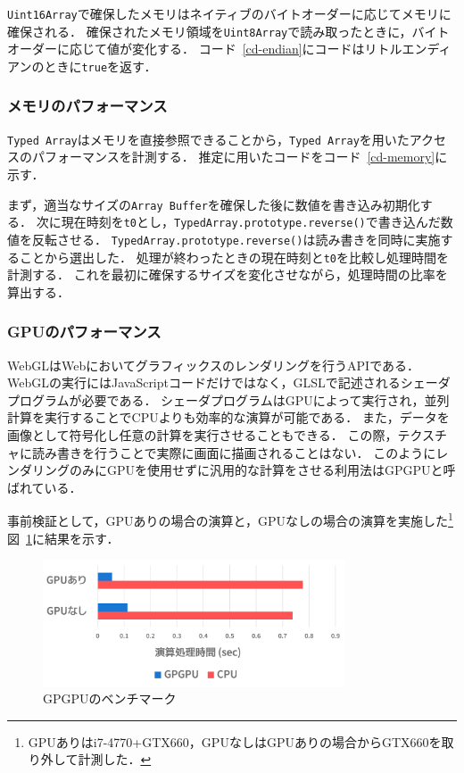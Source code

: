 \texttt{Uint16Array}で確保したメモリはネイティブのバイトオーダーに応じてメモリに確保される．
確保されたメモリ領域を\texttt{Uint8Array}で読み取ったときに，バイトオーダーに応じて値が変化する．
コード~\ref{cd-endian}にコードはリトルエンディアンのときに\texttt{true}を返す．

\subsubsection{メモリのパフォーマンス}
\texttt{Typed Array}はメモリを直接参照できることから，\texttt{Typed Array}を用いたアクセスのパフォーマンスを計測する．
推定に用いたコードをコード~\ref{cd-memory}に示す．



まず，適当なサイズの\texttt{Array Buffer}を確保した後に数値を書き込み初期化する．
次に現在時刻を\texttt{t0}とし，\texttt{TypedArray.prototype.reverse()}で書き込んだ数値を反転させる．
\texttt{TypedArray.prototype.reverse()}は読み書きを同時に実施することから選出した．
処理が終わったときの現在時刻と\texttt{t0}を比較し処理時間を計測する．
これを最初に確保するサイズを変化させながら，処理時間の比率を算出する．

\subsubsection{GPUのパフォーマンス}
WebGLはWebにおいてグラフィックスのレンダリングを行うAPIである．
WebGLの実行にはJavaScriptコードだけではなく，GLSLで記述されるシェーダプログラムが必要である．
シェーダプログラムはGPUによって実行され，並列計算を実行することでCPUよりも効率的な演算が可能である．
また，データを画像として符号化し任意の計算を実行させることもできる．
この際，テクスチャに読み書きを行うことで実際に画面に描画されることはない．
このようにレンダリングのみにGPUを使用せずに汎用的な計算をさせる利用法はGPGPUと呼ばれている．

事前検証として，GPUありの場合の演算と，GPUなしの場合の演算を実施した\footnote{GPUありはi7-4770+GTX660，GPUなしはGPUありの場合からGTX660を取り外して計測した．}
図~\ref{fig-gpgpu}に結果を示す．

\begin{figure}[H]
	\centering
    \includegraphics[width=0.8\textwidth,pagebox=artbox]{fig/gpgpu.png}
    \caption{GPGPUのベンチマーク}
    \label{fig-gpgpu}
\end{figure}

